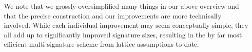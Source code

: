 We note that we grossly oversimplified many things in our above overview and that the precise construction and our improvements are more technically involved.
While each individual improvement may seem conceptually simple, they all add up to significantly improved signature sizes, resulting in the by far most efficient multi-signature scheme from lattice assumptions to date.

